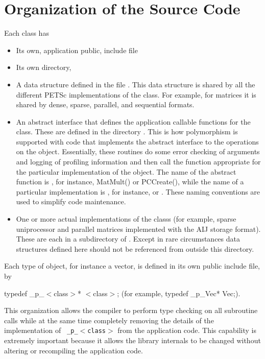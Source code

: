 \documentclass[twoside,12pt]{../sty/report_petsc}
\begin{document}
\section{Organization of the Source Code}

Each class has
\begin{itemize}
\item Its own, application public, include file 
\item Its own directory, 
\item A data structure defined in  the file
      .
      This data structure is shared by all the different PETSc implementations of the
      class. For example, for matrices it is shared by dense,
      sparse, parallel, and sequential formats.
\item An abstract interface that defines the application callable
      functions for the class. These are defined in the directory
      . This is how polymorphism is supported with code that implements the abstract interface to the
operations on the object.  Essentially, these routines do some error
checking of arguments and logging of profiling information
and then call the function appropriate for the
particular implementation of the object. The name of the abstract
function is , for instance, MatMult() or PCCreate(), while
the name of a particular implementation is
, for instance,
 or . These naming
conventions are used to simplify code maintenance.

\item One or more actual implementations of the classs (for example,
      sparse uniprocessor and parallel matrices implemented with the AIJ storage format).
      These are each in a subdirectory of
      . Except in rare
      circumstances data
      structures defined here should not be referenced from outside this
      directory.
\end{itemize}

Each type of object, for instance a vector, is defined in its own
public include file, by
\begin{tabbing}
   typedef \_p\_$<$class$>$* $<$class$>$; (for example, typedef \_p\_Vec* Vec;).
\end{tabbing}
  This organization
allows the compiler to perform type checking on all subroutine calls
while at the same time
completely removing the details of the implementation of {\tt
\_p\_$<$class$>$} from the application code.  This capability is extremely important
because it allows the library internals to be changed
without altering or recompiling the application code.
\end{document}
